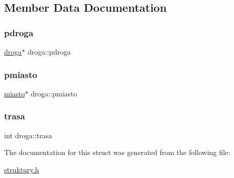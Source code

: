 \subsection{Member Data Documentation}
\mbox{\label{structdroga_a7ed57ce3de3b4184ba7f7c805964626f}} 
\subsubsection{\texorpdfstring{pdroga}{pdroga}}
{\footnotesize\ttfamily \mbox{\hyperlink{structdroga}{droga}}$\ast$ droga\+::pdroga}

\mbox{\label{structdroga_a9c782b9f5281ee0f4cb4581a364b4471}} 
\subsubsection{\texorpdfstring{pmiasto}{pmiasto}}
{\footnotesize\ttfamily \mbox{\hyperlink{structmiasto}{miasto}}$\ast$ droga\+::pmiasto}

\mbox{\label{structdroga_a4788083344d3da2783792f80b35ab524}} 
\subsubsection{\texorpdfstring{trasa}{trasa}}
{\footnotesize\ttfamily int droga\+::trasa}



The documentation for this struct was generated from the following file\+:\begin{DoxyCompactItemize}
\item 
\mbox{\hyperlink{struktury_8h}{struktury.\+h}}\end{DoxyCompactItemize}
